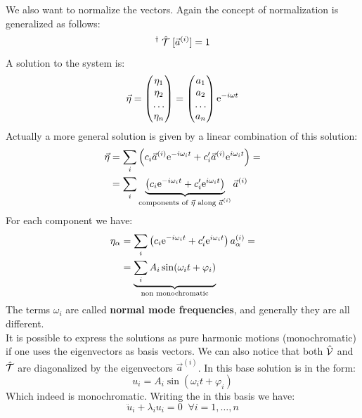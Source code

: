 We also want to normalize the vectors. Again the concept of normalization is generalized as follows:
\begin{equation}
    [\vec{a}^{(i)}]^{\dagger}\;\hat{\Telegant}\;[\vec{a}^{(i)}] = 1
\end{equation}
A solution to the system is:
\begin{equation}
    \vec{\eta} = \begin{pmatrix}
        \eta_1\\
        \eta_2\\
        \dots\\
        \eta_n
    \end{pmatrix}
    =
    \begin{pmatrix}
        a_1\\
        a_2\\
        \dots\\
        a_n
    \end{pmatrix}\mathrm{e}^{-i\omega t}
\end{equation}
Actually a more general solution is given by a linear combination of this solution:
\begin{equation}
    \begin{split}
        \vec{\eta} &= \displaystyle\sum_i\left(c_i \vec{a}^{(i)} \mathrm{e}^{-i\omega_i t} + c_i' \vec{a}^{(i)} \mathrm{e}^{i\omega_i t}\right) =\\
        &= \displaystyle\sum_i \underbrace{\left(c_i \mathrm{e}^{-i\omega_i t} + c_i' \mathrm{e}^{i\omega_i t}\right)}_{\text{components of $\vec{\eta}$ along $\vec{a}^{(i)}$}}\vec{a}^{(i)}
    \end{split}
\end{equation}
For each component we have:
\begin{equation}
    \begin{split}
        \eta_{\alpha} &= \displaystyle\sum_i \left(c_i \mathrm{e}^{-i\omega_i t} + c_i' \mathrm{e}^{i\omega_i t}\right)a_{\alpha}^{(i)} =\\
        &=  \underbrace{\displaystyle\sum_i A_i \sin(\omega_i t + \varphi_i)}_{\text{non monochromatic}}
    \end{split}
\end{equation}
The terms $\omega_i$ are called \textbf{normal mode frequencies}, and generally they are all different.\\
It is possible to express the solutions as pure harmonic motions (monochromatic) if one uses the eigenvectors as basis vectors. We can also notice that both $\hat{\mathcal{V}}$ and $\hat{\mathcal{T}}$ are diagonalized by the eigenvectors $\vec{a}^{(i)}$.
In this base solution is in the form:
\begin{equation}
    u_i = A_i \sin(\omega_i t + \varphi_i)
\end{equation}
Which indeed is monochromatic. Writing the \eleref\;in this basis we have:
\begin{equation}
    \ddot{u}_i +\lambda_i u_i = 0 \;\;\forall i=1,\dots,n
\end{equation}
